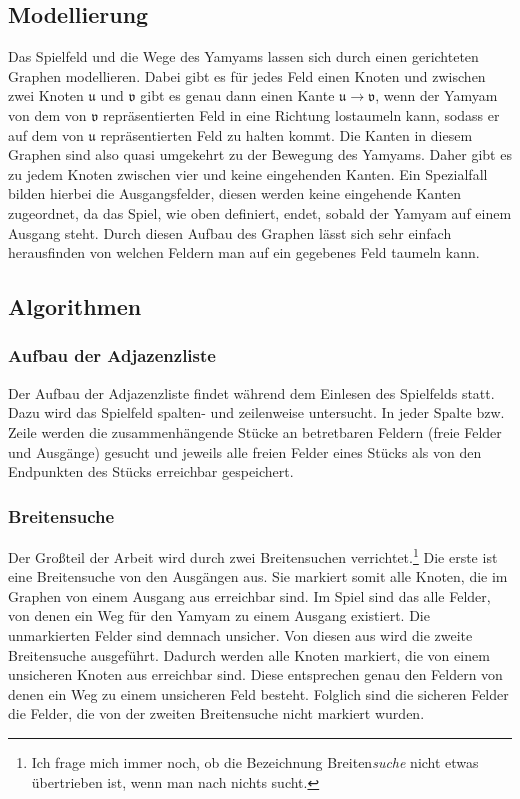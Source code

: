 \documentclass[12pt]{article}
\begin{document}
\subsection{Modellierung}
Das Spielfeld und die Wege des Yamyams lassen sich durch einen gerichteten Graphen modellieren. Dabei gibt es für jedes Feld einen Knoten und zwischen zwei Knoten $\mathfrak{u}$ und $\mathfrak{v}$ gibt es genau dann einen Kante $\mathfrak{u}\to\mathfrak{v}$, wenn der Yamyam von dem von $\mathfrak{v}$ repräsentierten Feld in eine Richtung lostaumeln kann, sodass er auf dem von $\mathfrak{u}$ repräsentierten Feld zu halten kommt. Die Kanten in diesem Graphen sind also quasi umgekehrt zu der Bewegung des Yamyams. Daher gibt es zu jedem Knoten zwischen vier und keine eingehenden Kanten. Ein Spezialfall bilden hierbei die Ausgangsfelder, diesen werden keine eingehende Kanten zugeordnet, da das Spiel, wie oben definiert, endet, sobald der Yamyam auf einem Ausgang steht. Durch diesen Aufbau des Graphen lässt sich sehr einfach herausfinden von welchen Feldern man auf ein gegebenes Feld taumeln kann.
\subsection{Algorithmen}
\subsubsection{Aufbau der Adjazenzliste}
Der Aufbau der Adjazenzliste findet während dem Einlesen des Spielfelds statt. Dazu wird das Spielfeld spalten- und zeilenweise untersucht. In jeder Spalte bzw. Zeile werden die zusammenhängende Stücke an betretbaren Feldern (freie Felder und Ausgänge) gesucht und jeweils alle freien Felder eines Stücks als von den Endpunkten des Stücks erreichbar gespeichert.
\subsubsection{Breitensuche}
Der Großteil der Arbeit wird durch zwei Breitensuchen verrichtet.\footnote{Ich frage mich immer noch, ob die Bezeichnung Breiten\textit{suche} nicht etwas übertrieben ist, wenn man nach nichts sucht.} Die erste ist eine Breitensuche von den Ausgängen aus. Sie markiert somit alle Knoten, die im Graphen von einem Ausgang aus erreichbar sind. Im Spiel sind das alle Felder, von denen ein Weg für den Yamyam zu einem Ausgang existiert. Die unmarkierten Felder sind demnach unsicher. Von diesen aus wird die zweite Breitensuche ausgeführt. Dadurch werden alle Knoten markiert, die von einem unsicheren Knoten aus erreichbar sind. Diese entsprechen genau den Feldern von denen ein Weg zu einem unsicheren Feld besteht. Folglich sind die sicheren Felder die Felder, die von der zweiten Breitensuche nicht markiert wurden. 
\end{document}
